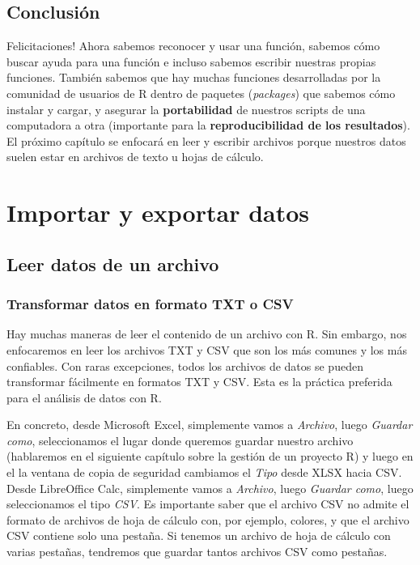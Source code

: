 \documentclass[
]{book}
\begin{document}
\hypertarget{conclusiuxf3n-4}{%
\section{Conclusión}\label{conclusiuxf3n-4}}

Felicitaciones! Ahora sabemos reconocer y usar una función, sabemos cómo buscar ayuda para una función e incluso sabemos escribir nuestras propias funciones. También sabemos que hay muchas funciones desarrolladas por la comunidad de usuarios de R dentro de paquetes (\emph{packages}) que sabemos cómo instalar y cargar, y asegurar la \textbf{portabilidad} de nuestros scripts de una computadora a otra (importante para la \textbf{reproducibilidad de los resultados}). El próximo capítulo se enfocará en leer y escribir archivos porque nuestros datos suelen estar en archivos de texto u hojas de cálculo.

\hypertarget{import}{%
\chapter{Importar y exportar datos}\label{import}}

\hypertarget{l016read}{%
\section{Leer datos de un archivo}\label{l016read}}

\hypertarget{l016transfo}{%
\subsection{Transformar datos en formato TXT o CSV}\label{l016transfo}}

Hay muchas maneras de leer el contenido de un archivo con R. Sin embargo, nos enfocaremos en leer los archivos TXT y CSV que son los más comunes y los más confiables. Con raras excepciones, todos los archivos de datos se pueden transformar fácilmente en formatos TXT y CSV. Esta es la práctica preferida para el análisis de datos con R.

En concreto, desde Microsoft Excel, simplemente vamos a \emph{Archivo}, luego \emph{Guardar como}, seleccionamos el lugar donde queremos guardar nuestro archivo (hablaremos en el siguiente capítulo sobre la gestión de un proyecto R) y luego en el la ventana de copia de seguridad cambiamos el \emph{Tipo} desde XLSX hacia CSV. Desde LibreOffice Calc, simplemente vamos a \emph{Archivo}, luego \emph{Guardar como}, luego seleccionamos el tipo \emph{CSV}. Es importante saber que el archivo CSV no admite el formato de archivos de hoja de cálculo con, por ejemplo, colores, y que el archivo CSV contiene solo una pestaña. Si tenemos un archivo de hoja de cálculo con varias pestañas, tendremos que guardar tantos archivos CSV como pestañas.
\end{document}
